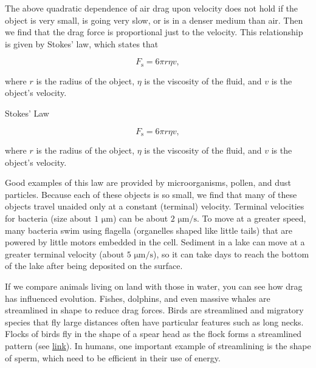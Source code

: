 \documentclass[
]{book}
\newenvironment{note}{}{}
\begin{document}
The above quadratic dependence of air drag upon velocity does not hold
if the object is very small, is going very slow, or is in a denser
medium than air. Then we find that the drag force is proportional just
to the velocity. This relationship is given by \protect\hypertarget{import-auto-id1165298672873}{}{Stokes'
law}, which states that

\leavevmode\hypertarget{eip-798}{}%
\[{{F_{\text{s}} = 6{\pi r\eta v}},}{}\]

where \(r\) is the radius of the object, \(\eta\) is the viscosity of the
fluid, and \(v\) is the object's velocity.

\hypertarget{fs-id1165296679489}{}
\begin{note}

Stokes' Law

\leavevmode\hypertarget{eip-271}{}%
\[{{F_{\text{s}} = 6{\pi r\eta v}},}{}\]

where \(r\) is the radius of the object, \(\eta\) is the viscosity of the
fluid, and \(v\) is the object's velocity.

\end{note}

Good examples of this law are provided by microorganisms, pollen, and
dust particles. Because each of these objects is so small, we find that
many of these objects travel unaided only at a constant (terminal)
velocity. Terminal velocities for bacteria (size about \(\text{1\ μm}\))
can be about \(\text{2\ μm/s}\). To move at a greater speed, many bacteria
swim using flagella (organelles shaped like little tails) that are
powered by little motors embedded in the cell. Sediment in a lake can
move at a greater terminal velocity (about \(\text{5\ μm/s}\)), so it can
take days to reach the bottom of the lake after being deposited on the
surface.

If we compare animals living on land with those in water, you can see
how drag has influenced evolution. Fishes, dolphins, and even massive
whales are streamlined in shape to reduce drag forces. Birds are
streamlined and migratory species that fly large distances often have
particular features such as long necks. Flocks of birds fly in the shape
of a spear head as the flock forms a streamlined pattern (see
\protect\hyperlink{import-auto-id1165298645387}{link}). In
humans, one important example of streamlining is the shape of sperm,
which need to be efficient in their use of energy.
\end{document}
